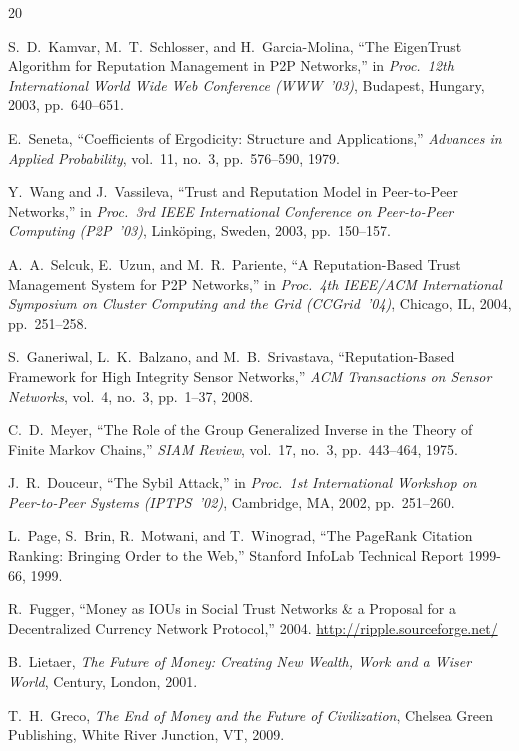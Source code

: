 \documentclass[11pt]{article}
\begin{document}
\begin{thebibliography}{20}

S.~D.~Kamvar, M.~T.~Schlosser, and H.~Garcia-Molina,
``The EigenTrust Algorithm for Reputation Management in P2P Networks,''
in \emph{Proc.\ 12th International World Wide Web Conference (WWW~'03)},
Budapest, Hungary, 2003, pp.~640--651.

E.~Seneta,
``Coefficients of Ergodicity: Structure and Applications,''
\emph{Advances in Applied Probability}, vol.~11, no.~3, pp.~576--590, 1979.

Y.~Wang and J.~Vassileva,
``Trust and Reputation Model in Peer-to-Peer Networks,''
in \emph{Proc.\ 3rd IEEE International Conference on Peer-to-Peer Computing (P2P~'03)},
Link\"oping, Sweden, 2003, pp.~150--157.

A.~A.~Selcuk, E.~Uzun, and M.~R.~Pariente,
``A Reputation-Based Trust Management System for P2P Networks,''
in \emph{Proc.\ 4th IEEE/ACM International Symposium on Cluster Computing and the Grid (CCGrid~'04)},
Chicago, IL, 2004, pp.~251--258.

S.~Ganeriwal, L.~K.~Balzano, and M.~B.~Srivastava,
``Reputation-Based Framework for High Integrity Sensor Networks,''
\emph{ACM Transactions on Sensor Networks}, vol.~4, no.~3, pp.~1--37, 2008.

C.~D.~Meyer,
``The Role of the Group Generalized Inverse in the Theory of Finite Markov Chains,''
\emph{SIAM Review}, vol.~17, no.~3, pp.~443--464, 1975.

J.~R.~Douceur,
``The Sybil Attack,''
in \emph{Proc.\ 1st International Workshop on Peer-to-Peer Systems (IPTPS~'02)},
Cambridge, MA, 2002, pp.~251--260.

L.~Page, S.~Brin, R.~Motwani, and T.~Winograd,
``The PageRank Citation Ranking: Bringing Order to the Web,''
Stanford InfoLab Technical Report 1999-66, 1999.

R.~Fugger,
``Money as IOUs in Social Trust Networks \& a Proposal for a Decentralized Currency Network Protocol,''
2004. \url{http://ripple.sourceforge.net/}

B.~Lietaer,
\emph{The Future of Money: Creating New Wealth, Work and a Wiser World},
Century, London, 2001.

T.~H.~Greco,
\emph{The End of Money and the Future of Civilization},
Chelsea Green Publishing, White River Junction, VT, 2009.


\end{thebibliography}
\end{document}
